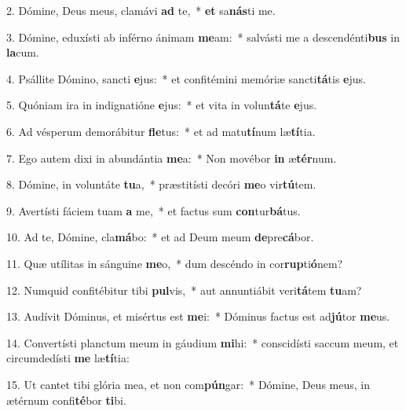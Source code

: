 2. Dómine, Deus meus, clamávi \textbf{ad} te,~*  \textbf{et} sa\textbf{nás}ti me.\

3. Dómine, eduxísti ab inférno ánimam \textbf{me}am:~*  salvásti me a descendénti\textbf{bus} in \textbf{la}cum.\

4. Psállite Dómino, sancti \textbf{e}jus:~*  et confitémini memóriæ sancti\textbf{tá}tis \textbf{e}jus.\

5. Quóniam ira in indignatióne \textbf{e}jus:~*  et vita in volun\textbf{tá}te \textbf{e}jus.\

6. Ad vésperum demorábitur \textbf{fle}tus:~*  et ad matu\textbf{tí}num læ\textbf{tí}tia.\

7. Ego autem dixi in abundántia \textbf{me}a:~*  Non movébor \textbf{in} æ\textbf{tér}num.\

8. Dómine, in voluntáte \textbf{tu}a,~*  præstitísti decóri \textbf{me}o vir\textbf{tú}tem.\

9. Avertísti fáciem tuam \textbf{a} me,~*  et factus sum \textbf{con}tur\textbf{bá}tus.\

10. Ad te, Dómine, cla\textbf{má}bo:~*  et ad Deum meum \textbf{de}pre\textbf{cá}bor.\

11. Quæ utílitas in sánguine \textbf{me}o,~*  dum descéndo in cor\textbf{rup}ti\textbf{ó}nem?\

12. Numquid confitébitur tibi \textbf{pul}vis,~*  aut annuntiábit veri\textbf{tá}tem \textbf{tu}am?\

13. Audívit Dóminus, et misértus est \textbf{me}i:~*  Dóminus factus est ad\textbf{jú}tor \textbf{me}us.\

14. Convertísti planctum meum in gáudium \textbf{mi}hi:~*  conscidísti saccum meum, et circumdedísti \textbf{me} læ\textbf{tí}tia:\

15. Ut cantet tibi glória mea, et non com\textbf{pún}gar:~*  Dómine, Deus meus, in ætérnum confi\textbf{té}bor \textbf{ti}bi.\

